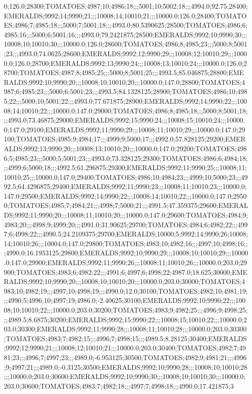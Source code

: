 0;126.0;28300;TOMATOES;4987;10;4986;18;;;5001;10;5002;18;;;4994.0;92.75;28400;EMERALDS;9992;14;9990;21;;;10008;14;10010;21;;;10000.0;126.0;28400;TOMATOES;4986;7;4985;18;;;5000;7;5001;18;;;4993.0;80.5390625;28500;TOMATOES;4986;6;4985;16;;;5000;6;5001;16;;;4993.0;79.2421875;28500;EMERALDS;9992;10;9990;30;;;10008;10;10010;30;;;10000.0;126.0;28600;TOMATOES;4986;8;4985;23;;;5000;8;5001;23;;;4993.0;74.0625;28600;EMERALDS;9992;12;9990;29;;;10008;12;10010;29;;;10000.0;126.0;28700;EMERALDS;9992;13;9990;24;;;10008;13;10010;24;;;10000.0;126.0;28700;TOMATOES;4987;8;4985;25;;;5000;8;5001;25;;;4993.5;85.046875;28800;EMERALDS;9992;10;9990;20;;;10008;10;10010;20;;;10000.0;147.0;28800;TOMATOES;4987;6;4985;23;;;5000;6;5001;23;;;4993.5;84.1328125;28900;TOMATOES;4986;10;4985;22;;;5000;10;5001;22;;;4993.0;77.671875;28900;EMERALDS;9992;14;9990;22;;;10008;14;10010;22;;;10000.0;147.0;29000;TOMATOES;4986;8;4985;18;;;5000;8;5001;18;;;4993.0;73.46875;29000;EMERALDS;9992;15;9990;24;;;10008;15;10010;24;;;10000.0;147.0;29100;EMERALDS;9992;11;9990;29;;;10008;11;10010;29;;;10000.0;147.0;29100;TOMATOES;4985;9;4984;17;;;4999;9;5000;17;;;4992.0;57.828125;29200;EMERALDS;9992;13;9990;20;;;10008;13;10010;20;;;10000.0;147.0;29200;TOMATOES;4986;5;4985;23;;;5000;5;5001;23;;;4993.0;73.328125;29300;TOMATOES;4986;6;4984;18;;;4999;6;5000;18;;;4992.5;61.296875;29300;EMERALDS;9992;11;9990;25;;;10008;11;10010;25;;;10000.0;147.0;29400;TOMATOES;4986;10;4984;23;;;4999;10;5000;23;;;4992.5;64.4296875;29400;EMERALDS;9992;11;9990;23;;;10008;11;10010;23;;;10000.0;147.0;29500;EMERALDS;9992;14;9990;22;;;10008;14;10010;22;;;10000.0;147.0;29500;TOMATOES;4985;7;4984;21;;;4998;7;5000;21;;;4991.5;47.359375;29600;EMERALDS;9992;11;9990;20;;;10008;11;10010;20;;;10000.0;147.0;29600;TOMATOES;4984;9;4983;20;;;4998;9;4999;20;;;4991.0;31.90625;29700;TOMATOES;4984;6;4982;22;;;4997;6;4998;22;;;4990.5;24.2109375;29700;EMERALDS;10000;5;9992;14;9990;26;10008;14;10010;26;;;10004.0;147.0;29800;TOMATOES;4983;10;4982;16;;;4997;10;4998;16;;;4990.0;16.1953125;29800;EMERALDS;9992;10;9990;29;;;10008;10;10010;29;;;10000.0;147.0;29900;EMERALDS;9992;11;9990;26;;;10008;11;10010;26;;;10000.0;203.0;29900;TOMATOES;4983;6;4982;22;;;4991;6;4997;6;4998;22;4987.0;18.625;30000;EMERALDS;9992;10;9990;20;;;10008;10;10010;20;;;10000.0;203.0;30000;TOMATOES;4983;10;4982;19;;;4997;10;4998;19;;;4990.0;12.0;30100;TOMATOES;4982;10;4981;19;;;4990;5;4996;10;4997;19;4986.0;-2.40625;30100;EMERALDS;9992;10;9990;22;;;10008;10;10010;22;;;10000.0;203.0;30200;TOMATOES;4983;9;4982;25;;;4996;9;4998;25;;;4989.5;8.6875;30200;EMERALDS;9992;15;9990;22;;;10008;15;10010;22;;;10000.0;203.0;30300;EMERALDS;9992;11;9990;28;;;10008;11;10010;28;;;10000.0;203.0;30300;TOMATOES;4983;7;4982;15;;;4996;7;4998;15;;;4989.5;8.28125;30400;EMERALDS;9992;12;9990;21;;;10008;12;10010;21;;;10000.0;203.0;30400;TOMATOES;4982;7;4981;23;;;4996;7;4997;23;;;4989.0;-6.953125;30500;TOMATOES;4982;9;4981;21;;;4996;9;4997;21;;;4989.0;-0.3125;30500;EMERALDS;9992;10;9990;28;;;10008;10;10010;28;;;10000.0;203.0;30600;EMERALDS;9992;10;9990;30;;;10008;10;10010;30;;;10000.0;203.0;30600;TOMATOES;4983;7;4982;18;;;4997;7;4998;18;;;4990.0;17.421875;3